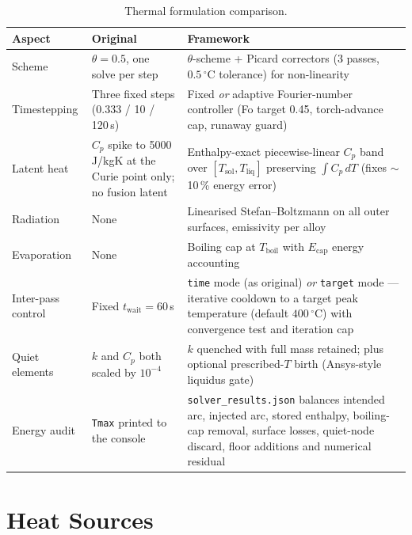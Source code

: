 \documentclass[10pt,a4paper]{article}
\newcommand{\code}[1]{\texttt{#1}}
\begin{document}
\begin{table}[h!]
\centering
\caption{Thermal formulation comparison.}
\label{tab:thermal}
\small
\begin{tabularx}{\linewidth}{@{}l X X@{}}
\toprule
\textbf{Aspect} & \textbf{Original} & \textbf{Framework} \\
\midrule
Scheme & $\theta = 0.5$, one solve per step & $\theta$-scheme + Picard
correctors (3 passes, $0.5\,^\circ$C tolerance) for non-linearity \\
\addlinespace
Timestepping & Three fixed steps (0.333 / 10 / 120\,s) & Fixed \emph{or}
adaptive Fourier-number controller (Fo target 0.45, torch-advance cap,
runaway guard) \\
\addlinespace
Latent heat & $C_p$ spike to 5000\,J/kgK at the Curie point only; no fusion
latent & Enthalpy-exact piecewise-linear $C_p$ band over
$[T_{\text{sol}}, T_{\text{liq}}]$ preserving $\int C_p\,dT$
(fixes $\sim$10\,\% energy error) \\
\addlinespace
Radiation & None & Linearised Stefan--Boltzmann on all outer surfaces,
emissivity per alloy \\
\addlinespace
Evaporation & None & Boiling cap at $T_{\text{boil}}$ with $E_{\text{cap}}$
energy accounting \\
\addlinespace
Inter-pass control & Fixed $t_{\text{wait}} = 60$\,s & \code{time} mode (as
original) \emph{or} \code{target} mode --- iterative cooldown to a target peak
temperature (default $400\,^\circ$C) with convergence test and iteration cap \\
\addlinespace
Quiet elements & $k$ and $C_p$ both scaled by $10^{-4}$ & $k$ quenched with
full mass retained; plus optional prescribed-$T$ birth (Ansys-style liquidus
gate) \\
\addlinespace
Energy audit & \code{Tmax} printed to the console & \code{solver\_results.json}
balances intended arc, injected arc, stored enthalpy, boiling-cap removal,
surface losses, quiet-node discard, floor additions and numerical residual \\
\bottomrule
\end{tabularx}
\end{table}

\section{Heat Sources}
\end{document}
